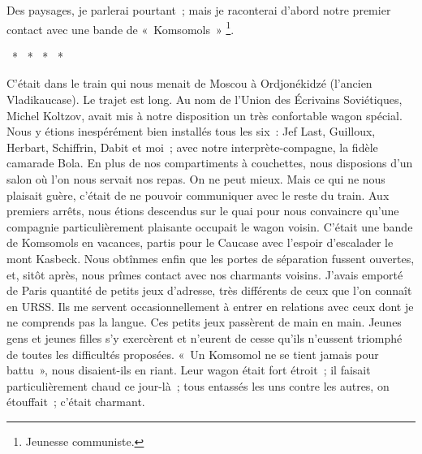 \documentclass[french,twoside]{book} %
\begin{document}
Des paysages, je parlerai pourtant ; mais je raconterai d’abord notre premier contact avec une bande de « Komsomols » \footnote{Jeunesse communiste.}.\par
{\centering \noindent *  *  *  *  *\par}
\noindent C’était dans le train qui nous menait de Moscou à Ordjonékidzé (l’ancien Vladikaucase). Le trajet est long. Au nom de l’Union des Écrivains Soviétiques, Michel Koltzov, avait mis à notre disposition un très confortable wagon spécial. Nous y étions inespérément bien installés tous les six : Jef Last, Guilloux, Herbart, Schiffrin, Dabit et moi ; avec notre interprète-compagne, la fidèle camarade Bola. En plus de nos compartiments à couchettes, nous disposions d’un salon où l’on nous servait nos repas. On ne peut mieux. Mais ce qui ne nous plaisait guère, c’était de ne pouvoir communiquer avec le reste du train. Aux premiers arrêts, nous étions descendus sur le quai pour nous convaincre qu’une compagnie particulièrement plaisante occupait le wagon voisin. C’était une bande de Komsomols en vacances, partis pour le Caucase avec l’espoir d’escalader le mont Kasbeck. Nous obtînmes enfin que les portes de séparation fussent ouvertes, et, sitôt après, nous prîmes contact avec nos charmants voisins. J’avais emporté de Paris quantité de petits jeux d’adresse, très différents de ceux que l’on connaît en URSS. Ils me servent occasionnellement à entrer en relations avec ceux dont je ne comprends pas la langue. Ces petits jeux passèrent de main en main. Jeunes gens et jeunes filles s’y exercèrent et n’eurent de cesse qu’ils n’eussent triomphé de toutes les difficultés proposées. « Un Komsomol ne se tient jamais pour battu », nous disaient-ils en riant. Leur wagon était fort étroit ; il faisait particulièrement chaud ce jour-là ; tous entassés les uns contre les autres, on étouffait ; c’était charmant.\par
\end{document}
